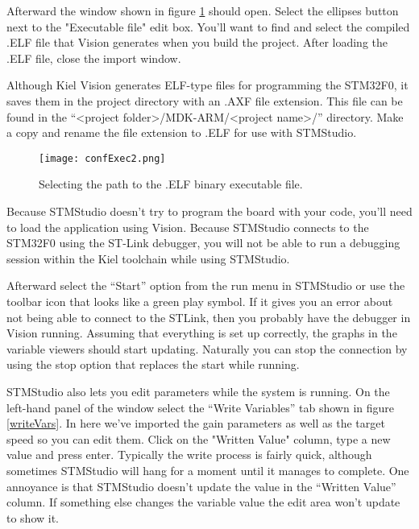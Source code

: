 \documentclass[openany,11pt,fleqn]{book} %
\begin{document}
Afterward the window shown in figure \ref{confExec} should open. Select the ellipses button next to the "Executable file" edit box. You'll want to find and select the compiled .ELF file that {\textmu}Vision generates when you build the project. After loading the .ELF file, close the import window.

\begin{warning}
Although Kiel {\textmu}Vision generates ELF-type files for programming the STM32F0, it saves them in the project directory with an .AXF file extension. This file can be found in the ``<project folder>/MDK-ARM/<project name>/'' directory. Make a copy and rename the file extension to .ELF for use with STMStudio. 
\end{warning}




\begin{figure}[tb]
    \centering\texttt{[image: confExec2.png]}
    \caption{Selecting the path to the .ELF binary executable file.}
    \label{confExec}
\end{figure}

\noindent Because STMStudio doesn't try to program the board with your code, you'll need to load the application using {\textmu}Vision. Because STMStudio connects to the STM32F0 using the ST-Link debugger, you will not be able to run a debugging session within the Kiel toolchain while using STMStudio. 

\noindent Afterward select the ``Start'' option from the run menu in STMStudio or use the toolbar icon that looks like a green play symbol. If it gives you an error about not being able to connect to the STLink, then you probably have the debugger in {\textmu}Vision running. Assuming that everything is set up correctly, the graphs in the variable viewers should start updating. Naturally you can stop the connection by using the stop option that replaces the start while running.

STMStudio also lets you edit parameters while the system is running. On the left-hand panel of the window select the ``Write Variables'' tab shown in figure \ref{writeVars}. In here we've imported the gain parameters as well as the target speed so you can edit them. Click on the "Written Value" column, type a new value and press enter. Typically the write process is fairly quick, although sometimes STMStudio will hang for a moment until it manages to complete. One annoyance is that STMStudio doesn't update the value in the ``Written Value'' column. If something else changes the variable value the edit area won't update to show it. 
\end{document}
